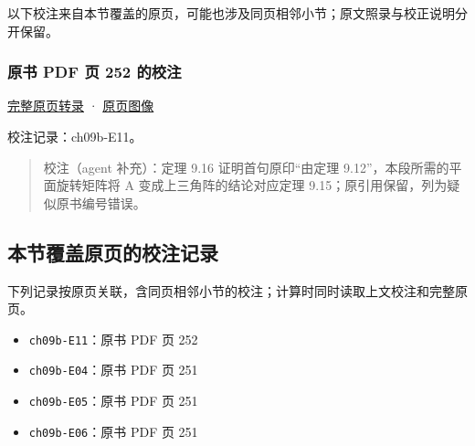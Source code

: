\documentclass[
  10pt,
  fontset=fandol]{ctexart}
\providecommand{\tightlist}{%
  \setlength{\itemsep}{0pt}\setlength{\parskip}{0pt}}
\begin{document}
以下校注来自本节覆盖的原页，可能也涉及同页相邻小节；原文照录与校正说明分开保留。

\subsubsection{原书 PDF 页 252 的校注}\label{ux539fux4e66-pdf-ux9875-252-ux7684ux6821ux6ce8}

\href{../pages/pdf-252.md}{完整原页转录} · \href{../../source-images/pdf-252.jpeg}{原页图像}

校注记录：ch09b-E11。

\begin{quote}
校注（agent 补充）：定理 9.16 证明首句原印``由定理 9.12''，本段所需的平面旋转矩阵将 A 变成上三角阵的结论对应定理 9.15；原引用保留，列为疑似原书编号错误。
\end{quote}

\subsection{本节覆盖原页的校注记录}\label{ux672cux8282ux8986ux76d6ux539fux9875ux7684ux6821ux6ce8ux8bb0ux5f55}

下列记录按原页关联，含同页相邻小节的校注；计算时同时读取上文校注和完整原页。

\begin{itemize}
\tightlist
\item
  \texttt{ch09b-E11}：原书 PDF 页 252
\item
  \texttt{ch09b-E04}：原书 PDF 页 251
\item
  \texttt{ch09b-E05}：原书 PDF 页 251
\item
  \texttt{ch09b-E06}：原书 PDF 页 251
\end{itemize}
\end{document}
